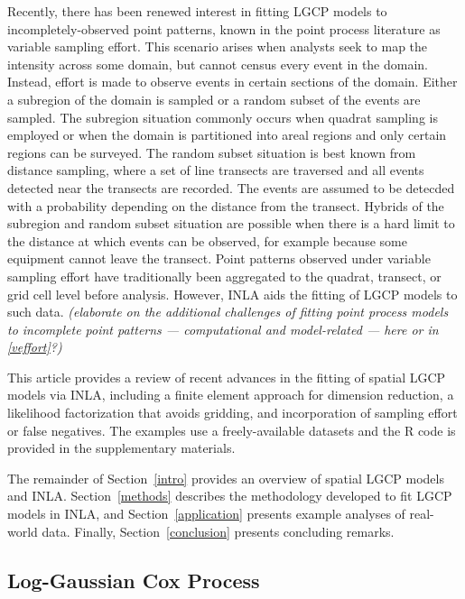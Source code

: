 \documentclass[]{interact}
\begin{document}
Recently, there has been renewed interest in fitting LGCP models to
incompletely-observed point patterns, known in the point process literature as
variable sampling effort. This scenario arises when analysts seek to map the
intensity across some domain, but cannot census every event in the domain.
Instead, effort is made to observe events in certain sections of the domain.
Either a subregion of the domain is sampled or a random subset of the events
are sampled. The subregion situation commonly occurs when quadrat sampling is
employed or when the domain is partitioned into areal regions and only certain
regions can be surveyed. The random subset situation is best known from
distance sampling, where a set of line transects are traversed and all events
detected near the transects are recorded. The events are assumed to be detecded
with a probability depending on the distance from the transect. Hybrids of the
subregion and random subset situation are possible when there is a hard limit
to the distance at which events can be observed, for example because some
equipment cannot leave the transect. Point patterns observed under variable
sampling effort have traditionally been aggregated to the quadrat, transect,
or grid cell level before analysis. However, INLA aids the fitting of LGCP
models to such data.
{\it (elaborate on the additional challenges of fitting point process models
to incomplete point patterns --- computational and model-related --- here or
in \ref{veffort}?)}

This article provides a review of recent advances in the fitting of spatial
LGCP models via INLA, including a finite element approach for dimension
reduction, a likelihood factorization that avoids gridding, and incorporation
of sampling effort or false negatives. The examples use a freely-available
datasets and the R code is provided in the supplementary materials.

The remainder of Section~\ref{intro} provides an overview of spatial LGCP
models and INLA. Section~\ref{methods} describes the methodology developed to
fit LGCP models in INLA, and Section~\ref{application} presents example
analyses of real-world data. Finally, Section~\ref{conclusion} presents
concluding remarks.


\subsection{Log-Gaussian Cox Process}
\label{lgcp}

\end{document}
